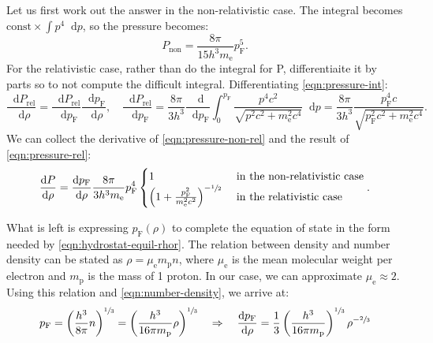 \documentclass[]{article}
\newcommand{\dd}{\mathop{}\!\mathrm{d}}
\newcommand{\fermiMtm}{p_\mathrm{F}}
\newcommand{\massElectron}{m_\mathrm{e}}
\newcommand{\massProton}{m_\mathrm{p}}
\begin{document}
	Let us first work out the answer in the non-relativistic case. The integral becomes $\text{const} \times \int p^4 \dd p$, so the pressure becomes:
	\begin{equation}\label{eqn:pressure-non-rel}
		P_\mathrm{non} = \frac{8 \pi}{15 h^3 \massElectron} \fermiMtm^5.
	\end{equation}
	For the relativistic case, rather than do the integral for P, differentiaite it by parts so to not compute the difficult integral. Differentiating \eqref{eqn:pressure-int}:
	\begin{equation}\label{eqn:pressure-rel}
		\frac{\dd P_\mathrm{rel}}{\dd \rho} = \frac{\dd P_\mathrm{rel}}{\dd \fermiMtm} \frac{\dd \fermiMtm}{\dd \rho}, \quad \frac{\dd P_\mathrm{rel}}{\dd \fermiMtm} = \frac{8\pi}{3h^3}\frac{\dd}{\dd \fermiMtm}\int_0^{\fermiMtm} \frac{p^4 c^2}{\sqrt{p^2c^2 + \massElectron^2 c^4}} \dd p = \frac{8\pi}{3h^3} \frac{\fermiMtm^4 c}{\sqrt{\fermiMtm^2c^2 + \massElectron^2 c^4}}.
	\end{equation}
	We can collect the derivative of \eqref{eqn:pressure-non-rel} and the result of \eqref{eqn:pressure-rel}:
	\begin{equation}\label{eqn:pressure-both}
		\frac{\dd P}{\dd \rho} = \frac{\dd \fermiMtm}{\dd \rho}\frac{8 \pi}{3 h^3 \massElectron} \fermiMtm^4\begin{cases}
			1 & \text{ in the non-relativistic case} \\
			\left(1 + \frac{\fermiMtm^2}{\massElectron^2 c^2}\right)^{-\sfrac{1}{2}} & \text{ in the relativistic case}
		\end{cases}.
 	\end{equation}

	What is left is expressing $\fermiMtm (\rho)$ to complete the equation of state in the form needed by \eqref{eqn:hydrostat-equil-rhor}. The relation between density and number density can be stated as $\rho = \mu_\mathrm{e} \massProton n$, where $\mu_\mathrm{e}$ is the mean molecular weight per electron and $\massProton$ is the mass of 1 proton. In our case, we can approximate $\mu_\mathrm{e} \approx 2$. Using this relation and \eqref{eqn:number-density}, we arrive at:
	\begin{equation}\label{eqn:fermi-mtm}
		\fermiMtm = \left( \frac{h^3}{8 \pi} n \right)^{\sfrac{1}{3}} = \left( \frac{h^3}{16 \pi \massProton} \rho\right)^{\sfrac{1}{3}} \quad \Rightarrow \quad \frac{\dd \fermiMtm}{\dd \rho} = \frac{1}{3} \left( \frac{h^3}{16 \pi \massProton}\right)^{\sfrac{1}{3}} \rho^{-\sfrac{2}{3}}
	\end{equation}
\end{document}
